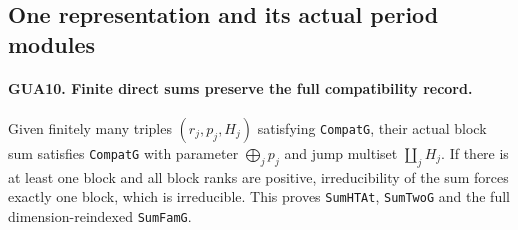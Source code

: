 \documentclass[11pt,a4paper]{article}
\numberwithin{equation}{section}
\theoremstyle{remark}\newtheorem{remark}[theorem]{Remark}
\begin{document}
\subsection{One representation and its actual period modules}

\paragraph{GUA10. Finite direct sums preserve the full compatibility record.}
\label{claim:GUA10}
Given finitely many triples $(r_j,p_j,H_j)$ satisfying
\texttt{Compat\allowbreak G}, their actual block sum satisfies
\texttt{Compat\allowbreak G} with parameter $\bigoplus_jp_j$
and jump multiset $\coprod_jH_j$.  If there is at least
one block and all block ranks are positive, irreducibility
of the sum forces exactly one block, which is irreducible.
This proves \texttt{Sum\allowbreak HTAt}, \texttt{Sum\allowbreak Two\allowbreak G} and
the full dimension-reindexed \texttt{Sum\allowbreak Fam\allowbreak G}.
\end{document}
